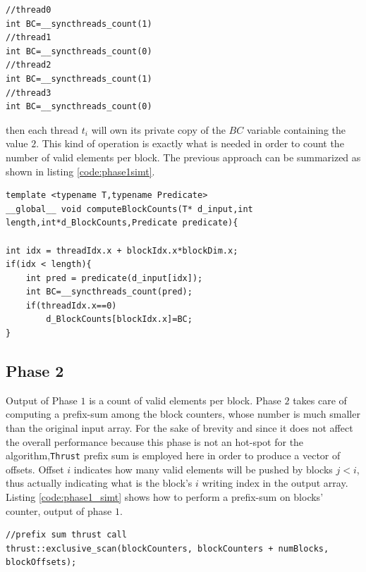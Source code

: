 \begin{lstlisting}
//thread0
int BC=__syncthreads_count(1)
//thread1
int BC=__syncthreads_count(0)
//thread2
int BC=__syncthreads_count(1)
//thread3
int BC=__syncthreads_count(0)
\end{lstlisting}
then each thread \(t_i\) will own its private copy of the \(BC\) variable containing the value $2$.
This kind of operation is exactly what is needed in order to count the number of valid elements per block.
The previous approach can be summarized as shown in listing \ref{code:phase1simt}.
\begin{lstlisting}
template <typename T,typename Predicate>
__global__ void computeBlockCounts(T* d_input,int length,int*d_BlockCounts,Predicate predicate){

int idx = threadIdx.x + blockIdx.x*blockDim.x;
if(idx < length){
	int pred = predicate(d_input[idx]);
	int BC=__syncthreads_count(pred);
	if(threadIdx.x==0)
		d_BlockCounts[blockIdx.x]=BC;
}
\end{lstlisting}

\subsection{Phase 2}
Output of Phase $1$ is a count of valid elements per block. 
Phase $2$ takes care of computing a prefix-sum among the block counters, whose number is much smaller than the original input array.
For the sake of brevity and since it does not affect the overall performance because this phase is not an hot-spot for the algorithm,\texttt{Thrust} prefix sum is employed here in order to produce a vector of offsets. Offset $i$ indicates how many valid elements will be pushed by blocks $j < i$, thus actually indicating what is the block's $i$ writing index in the output array.
Listing \ref{code:phase1_simt} shows how to perform a prefix-sum on blocks' counter, output of phase $1$.
\begin{lstlisting}
//prefix sum thrust call
thrust::exclusive_scan(blockCounters, blockCounters + numBlocks, blockOffsets);
\end{lstlisting}

